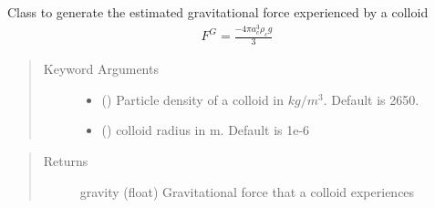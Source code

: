 \documentclass[letterpaper,10pt,english]{sphinxmanual}
\begin{document}
\begin{fulllineitems}
\label{\detokenize{index:lb_colloids.Colloids.Colloid_Math.Gravity}}
Class to generate the estimated gravitational force experienced by a colloid
\begin{equation*}
\begin{split}F^{G} = \frac{-4 \pi a_{c}^{3} \rho_{c} g}{3}\end{split}
\end{equation*}\begin{quote}\begin{description}
\item[{Keyword Arguments}] \leavevmode\begin{itemize}
\item {} 
 () \textendash{} Particle density of a colloid in \(kg/m^3\). Default is 2650.

\item {} 
 () \textendash{} colloid radius in m. Default is 1e-6

\end{itemize}

\end{description}\end{quote}
\begin{quote}\begin{description}
\item[{Returns}] \leavevmode
gravity (float) Gravitational force that a colloid experiences

\end{description}\end{quote}

\end{fulllineitems}

\end{document}
